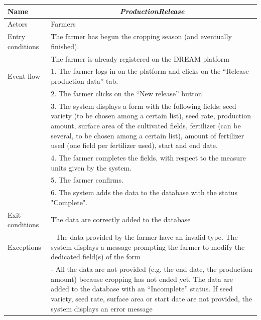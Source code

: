 \begin{table}[H]
	\centering
	\begin{tabularx}{\linewidth}{|l|X|}
		\hline
		Name & \multicolumn{1}{c|}{\textit{\textbf{ProductionRelease}}}                                                   \tabularnewline \hline
		Actors                                               & Farmers                                                    \tabularnewline \hline
		Entry conditions                                              & The farmer has begun the cropping season (and eventually finished). \tabularnewline
		&The farmer is already registered on the DREAM platform
		\tabularnewline \hline
		Event flow                                         & 1.	The farmer logs in on the platform and clicks on the “Release production data” tab.                                                                   \tabularnewline 
		& 2.	The farmer clicks on the “New release” button                                                   \tabularnewline 
		& 3.	The system displays a form with the following fields: seed variety (to be chosen among a certain list), seed rate, production amount, surface area of the cultivated fields, fertilizer (can be several, to be chosen among a certain list), amount of fertilizer used (one field per fertilizer used), start and end date.                                                 \tabularnewline 
		& 4.	The farmer completes the fields, with respect to the measure units given by the system.                                           \tabularnewline
		& 5.	The farmer confirms.                                               \tabularnewline
		& 6.	The system adds the data to the database with the status "Complete".      
		\tabularnewline \hline
		Exit conditions 
		& 
		The data are correctly added to the database
		\tabularnewline \hline
		Exceptions 
		& 
		-	The data provided by the farmer have an invalid type. The system displays a message prompting the farmer to modify the dedicated field(s) of the form
		\tabularnewline
		&-	All the data are not provided (e.g. the end date, the production amount) because cropping has not ended yet. The data are added to the database with an “Incomplete” status. If seed variety, seed rate, surface area or start date are not provided, the system displays an error message
		\tabularnewline
		\hline
	\end{tabularx}   
\end{table}

